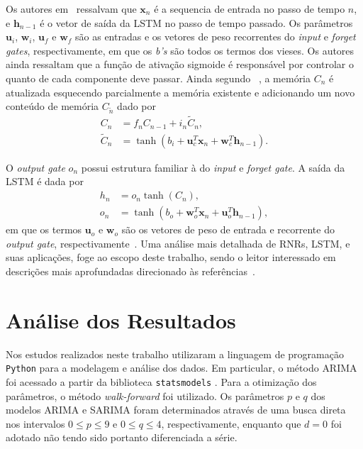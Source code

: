 \documentclass[a4paper]{ifacconf}
\begin{document}
Os autores em~\cite{Rasmus2019} ressalvam que $\textbf{x}_{n}$ é a sequencia de entrada no passo de tempo $n$, e
$\textbf{h}_{n-1}$ é o vetor de saída da \ac{LSTM} no passo de tempo passado. Os parâmetros $\textbf{u}_{i}$,
$\textbf{w}_{i}$, $\textbf{u}_{f}$ e $\textbf{w}_{f}$ são as entradas e os vetores de peso recorrentes do \textit{input}
e \textit{forget gates}, respectivamente, em que os \textit{b's} são todos os termos dos vieses. Os autores ainda
ressaltam que a função de ativação sigmoide é responsável por controlar o quanto de cada componente deve passar. Ainda
segundo ~\cite{Rasmus2019}, a memória $C_{n}$ é atualizada esquecendo parcialmente a memória existente e adicionando
um novo conteúdo de memória $C_{\tilde{n}}$ dado por %
\begin{subequations}
	\begin{align}
		C_{n} & = f_{n}C_{n-1}+i_{n}\tilde{C}_{n}, \label{eq.C}\\
		\tilde{C}_{n}  &= \tanh(b_{i} + \textbf{u}_{c}^{T}\textbf{x}_{n}+\textbf{w}_{c}^{T}\textbf{h}_{n-1}). \label{eq.C_tilde}
	\end{align}
\end{subequations}

O \textit{output gate} $o_{n}$ possui estrutura familiar à do \textit{input} e \textit{forget gate}. A saída da \ac{LSTM} é dada por %
\begin{subequations}
	\begin{align}
		h_{n} & = o_{n}\tanh(C_{n}) \label{eq.h}, \\
		o_{n}  &= \tanh(b_{o} + \textbf{w}_{o}^{T}\textbf{x}_{n}+\textbf{u}_{o}^{T}\textbf{h}_{n-1}), \label{eq.O}
	\end{align}
\end{subequations}
em que os termos $\textbf{u}_{o}$ e $\textbf{w}_{o}$ são os vetores de peso de entrada e recorrente do \textit{output gate}, respectivamente~\cite{Rasmus2019}. Uma análise mais detalhada de \acp{RNR}, \ac{LSTM}, e suas aplicações, foge ao escopo deste trabalho, sendo o leitor interessado em descrições mais aprofundadas direcionado às referências~\citep{Rasmus2019,Ghaderi2017,Pereira2017}.

\section{Análise dos Resultados}\label{sec:resultados}

Nos estudos realizados neste trabalho utilizaram a linguagem de programação \texttt{Python} para a modelagem e análise dos dados. Em particular, o método \ac{ARIMA} foi acessado a partir da biblioteca \texttt{statsmodels} \citep{Seabold_statsmodels2010}. Para a otimização dos parâmetros, o método \textit{walk-forward} foi utilizado. Os parâmetros $p$ e $q$ dos modelos \ac{ARIMA} e \ac{SARIMA} foram determinados através de uma busca direta nos intervalos $0 \leq p \leq 9$ e $0 \leq q \leq 4$, respectivamente, enquanto que $d = 0$ foi adotado não tendo sido portanto diferenciada a série.
\end{document}
